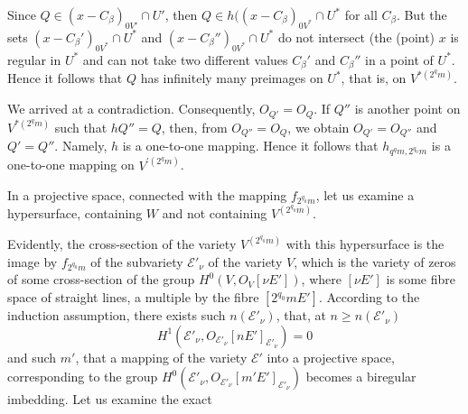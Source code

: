 Since $Q\in(x-C_\beta)_{0V'}\cap U'$, then $Q\in h((x-C_\beta)_{0V^*}\cap U^*$ for all $C_\beta$. But the sets $(x-C_\beta')_{0V^*}\cap U^*$ and $(x-C_\beta'')_{0V^*}\cap U^*$ do not intersect (the (point) $x$ is regular in $U^*$ and can not take two different values $C_\beta'$ and $C_\beta''$ in a point of $U^*$. Hence it follows that $Q$ has infinitely many preimages on $U^*$, that is, on $V^{*(2^qm)}$.

We arrived at a contradiction. Consequently, $O_{Q'}=O_Q$. If $Q''$ is another point on $V^{*(2^qm)}$ such that $hQ''=Q$, then, from $O_{Q''}=O_Q$, we obtain $O_{Q'}=O_{Q''}$ and $Q'=Q''$. Namely, $h$ is a one-to-one mapping. Hence it follows that $h_{q^qm,2^{q_0}m}$ is a one-to-one mapping on $V^{\prime(2^qm)}$.

In a projective space, connected with the mapping $f_{2^{q_0}m}$, let us examine a hypersurface, containing $W$ and not containing $V^{(2^{q_0}m)}$.

Evidently, the cross-section of the variety $V^{(2^{q_0}m)}$ with this hypersurface is the image by $f_{2^{q_0}m}$ of the subvariety $\mathcal E'_\nu$ of the variety $V$, which is the variety of zeros of some cross-section of the group $H^0(V,O_V[\nu E'])$,  where $[\nu E']$ is some fibre space of straight lines, a multiple by the fibre $[2^{q_0}mE']$. According to the induction assumption, there exists such $n(\mathcal E'_\nu)$, that, at $n\ge n(\mathcal E'_\nu)$
\[
H^1(\mathcal E'_\nu,O_{\mathcal E'_\nu}[nE']_{\mathcal E'_\nu})=0
\]
and such $m'$, that a mapping of the variety $\mathcal E'$ into a projective space, corresponding to the group $H^0(\mathcal E'_\nu,O_{\mathcal E'_\nu}[m'E']_{\mathcal E'_\nu})$ becomes a biregular imbedding. Let us examine the exact
